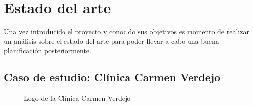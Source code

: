 \chapter{Estado del arte}
Una vez introducido el proyecto y conocido sus objetivos es momento de realizar un análisis sobre el estado del arte para poder llevar a cabo una buena planificación posteriormente.

\section{Caso de estudio: Clínica Carmen Verdejo}
\begin{figure}[H]
    \caption{Logo de la Clínica Carmen Verdejo}
    \label{fig:carmen-verdejo}
\end{figure}

